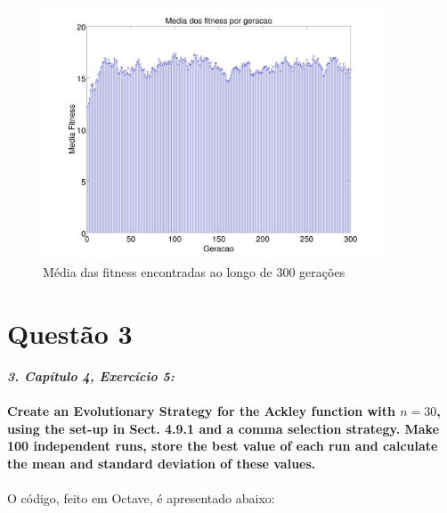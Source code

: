 \documentclass{report}
\begin{document}
	\begin{figure}[H]
		\centering
		\includegraphics[width = 0.9\textwidth]{Q02_media_fitness_300.jpg}
		\caption{Média das fitness encontradas ao longo de 300 gerações}
		\label{media_fitness_300_q02}
	\end{figure}
	
	\section*{Questão 3}
	
	\textbf{\textit{3. Capítulo 4, Exercício 5:}}\\\\
	
	\textbf{Create an Evolutionary Strategy for the Ackley function with $n = 30$, using the set-up in Sect. 4.9.1 and a comma selection strategy. Make 100 independent runs, store the best value of each run and calculate the mean and standard deviation of these values.}
	
	\paragraph{} O código, feito em Octave, é apresentado abaixo:\\
	
\end{document}
